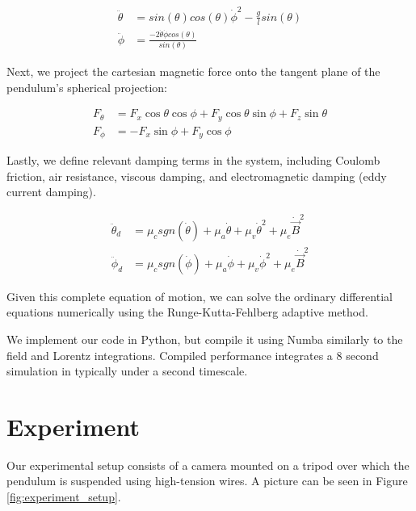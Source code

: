 \documentclass[prl,twocolumn,amsmath,amssymb,superscriptaddress]{revtex4-2}
\begin{document}
\begin{equation}
    \begin{split}
        \ddot{\theta} &= sin(\theta)cos(\theta)\dot{\phi}^2 - \frac{g}{l}sin(\theta)\\
        \ddot{\phi} &= \frac{-2\dot{\theta}\dot{\phi}cos(\theta)}{sin(\theta)}
    \end{split}
    \label{equation:motion}
\end{equation}

Next, we project the cartesian magnetic force onto the tangent plane of the pendulum's spherical projection:

\begin{equation}
\begin{split}
    F_\theta &= F_x \cos\theta \cos\phi + F_y \cos\theta \sin\phi + F_z \sin\theta \\
    F_\phi &= -F_x \sin\phi + F_y \cos\phi
\end{split}
\end{equation}

Lastly, we define relevant damping terms in the system, including Coulomb friction, air resistance, viscous damping, and electromagnetic damping (eddy current damping).

\begin{equation}
    \begin{split}
        \ddot{\theta}_d &= \mu_c sgn(\dot{\theta}) + \mu_a \dot{\theta} + \mu_v \dot{\theta}^2 + \mu_e \dot{\vec{B}}^2 \\
        \ddot{\phi}_d &=\mu_c sgn(\dot{\phi}) + \mu_a \dot{\phi} + \mu_v \dot{\phi}^2 + \mu_e \dot{\vec{B}}^2
    \end{split}
    \label{equation:damping}
\end{equation}

Given this complete equation of motion, we can solve the ordinary differential equations numerically using the Runge-Kutta-Fehlberg adaptive method.

We implement our code in Python, but compile it using Numba similarly to the field and Lorentz integrations. Compiled performance integrates a 8 second simulation in typically under a second timescale.

\section{Experiment}
Our experimental setup consists of a camera mounted on a tripod over which the pendulum is suspended using high-tension wires. A picture can be seen in Figure \ref{fig:experiment_setup}.
\end{document}
